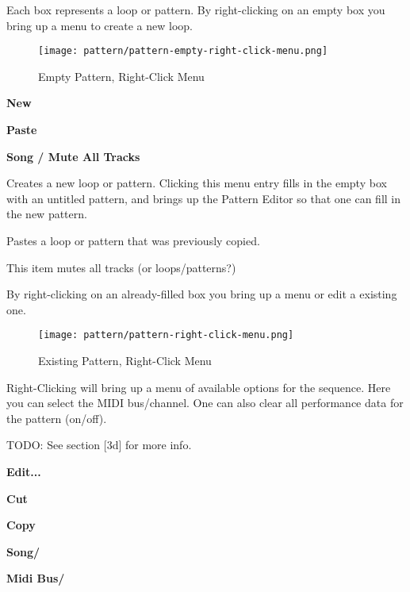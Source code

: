    Each box represents a loop or pattern.
   By right-clicking on an empty box you bring up a menu to create
   a new loop.

\begin{figure}[H]
   \centering 
   \texttt{[image: pattern/pattern-empty-right-click-menu.png]}
   \caption{Empty Pattern, Right-Click Menu}
   \label{fig:pattern_window_empty_right_click}
\end{figure}

   \begin{enumber}
      \item \textbf{New}
      \item \textbf{Paste}
      \item \textbf{Song / Mute All Tracks}
   \end{enumber}

   \setcounter{ItemCounter}{0}      %

   Creates a new loop or pattern.
   Clicking this menu entry fills in the empty box with an untitled
   pattern, and brings up the Pattern Editor
   so that one can fill in the new pattern.

   Pastes a loop or pattern that was previously copied.

   This item mutes all tracks (or loops/patterns?)





   By right-clicking on an already-filled box you bring up a menu
   or edit a existing one.

\begin{figure}[H]
   \centering 
   \texttt{[image: pattern/pattern-right-click-menu.png]}
   \caption{Existing Pattern, Right-Click Menu}
   \label{fig:pattern_window_right_click}
\end{figure}

   Right-Clicking will bring up a menu of available options
   for the sequence.  Here you can select the MIDI bus/channel.
   One can also clear all performance data for the pattern (on/off).
   
   TODO: See section [3d] for more info.

   \begin{enumber}
      \item \textbf{Edit...}
      \item \textbf{Cut}
      \item \textbf{Copy}
      \item \textbf{Song/}
      \item \textbf{Midi Bus/}
   \end{enumber}


